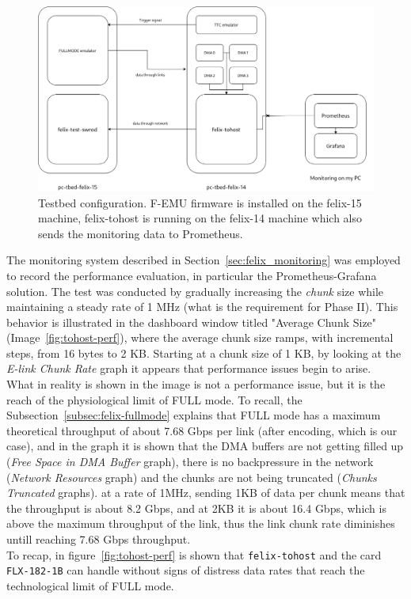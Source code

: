 \begin{figure}[htbp]
\centering
\includegraphics[width=\textwidth]{images/results/tohost-tbed-setup.png}
\caption[Testbed configuration]{Testbed configuration. F-EMU firmware is installed on the felix-15 machine, felix-tohost is running on the felix-14 machine which also sends the monitoring data to Prometheus.}
\label{fig:tbed-setup}
\end{figure}

The monitoring system described in Section~\ref{sec:felix_monitoring} was employed to record the performance evaluation, in particular the Prometheus-Grafana solution. The test was conducted by gradually increasing the \emph{chunk} size while maintaining a steady rate of 1 MHz (what is the requirement for Phase II). This behavior is illustrated in the dashboard window titled "Average Chunk Size" (Image~\ref{fig:tohost-perf}), where the average chunk size ramps, with incremental steps, from 16 bytes to 2 KB. Starting at a chunk size of 1 KB, by looking at the \emph{E-link Chunk Rate} graph it appears that performance issues begin to arise.\\
What in reality is shown in the image is not a performance issue, but it is the reach of the physiological limit of FULL mode. To recall, the Subsection~\ref{subsec:felix-fullmode} explains that FULL mode has a maximum theoretical throughput of about 7.68 Gbps per link (after encoding, which is our case), and in the graph it is shown that the \acs{DMA} buffers are not getting filled up (\emph{Free Space in DMA Buffer} graph), there is no backpressure in the network (\emph{Network Resources} graph) and the chunks are not being truncated (\emph{Chunks Truncated} graphs). at a rate of 1MHz, sending 1KB of data per chunk means that the throughput is about 8.2 Gbps, and at 2KB it is about 16.4 Gbps, which is above the maximum throughput of the link, thus the link chunk rate diminishes untill reaching 7.68 Gbps throughput.\\ 
To recap, in figure~\ref{fig:tohost-perf} is shown that \texttt{felix-tohost} and the card \texttt{FLX-182-1B} can handle without signs of distress data rates that reach the technological limit of FULL mode.

